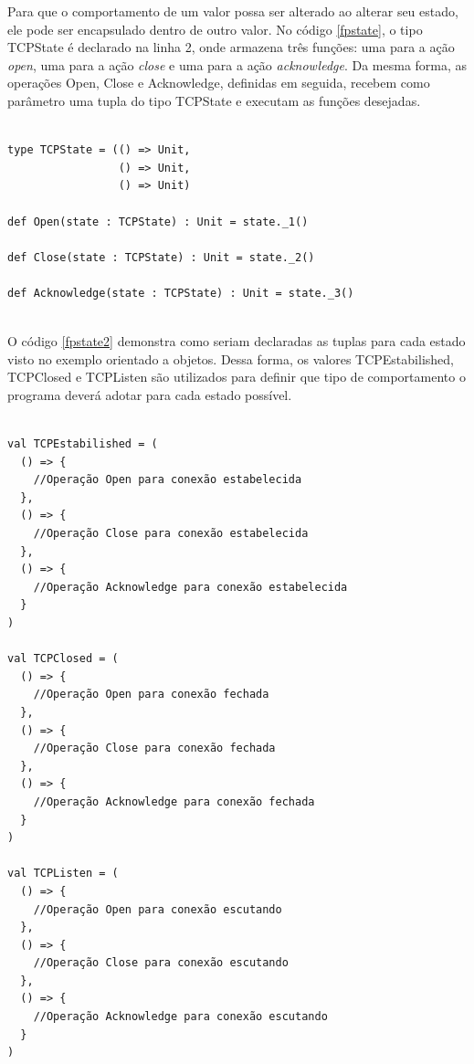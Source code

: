 Para que o comportamento de um valor possa 
ser alterado ao alterar seu estado, ele 
pode ser encapsulado dentro de outro valor. 
No código \ref{fpstate}, o tipo TCPState 
é declarado na linha 2, onde armazena 
três funções: uma para a ação \textit{open}, 
uma para a ação \textit{close} e uma para 
a ação \textit{acknowledge}. Da mesma forma, 
as operações Open, Close e Acknowledge, 
definidas em seguida, recebem como 
parâmetro uma tupla do tipo TCPState e 
executam as funções desejadas.

\begin{lstlisting}[caption={State Funcional},label=fpstate]
    
type TCPState = (() => Unit,
                 () => Unit,
                 () => Unit)

def Open(state : TCPState) : Unit = state._1()

def Close(state : TCPState) : Unit = state._2()

def Acknowledge(state : TCPState) : Unit = state._3()
    
\end{lstlisting}

O código \ref{fpstate2} demonstra como seriam 
declaradas as tuplas para cada estado visto 
no exemplo orientado a objetos. Dessa forma, 
os valores TCPEstabilished, TCPClosed e 
TCPListen são utilizados para definir que 
tipo de comportamento o programa deverá 
adotar para cada estado possível.

\begin{lstlisting}[caption={State Funcional},label=fpstate2]
    
val TCPEstabilished = (
  () => {
    //Operação Open para conexão estabelecida
  },
  () => {
    //Operação Close para conexão estabelecida
  },
  () => {
    //Operação Acknowledge para conexão estabelecida
  }
)

val TCPClosed = (
  () => {
    //Operação Open para conexão fechada
  },
  () => {
    //Operação Close para conexão fechada
  },
  () => {
    //Operação Acknowledge para conexão fechada
  }
)

val TCPListen = (
  () => {
    //Operação Open para conexão escutando
  },
  () => {
    //Operação Close para conexão escutando
  },
  () => {
    //Operação Acknowledge para conexão escutando
  }
)
    
\end{lstlisting}
